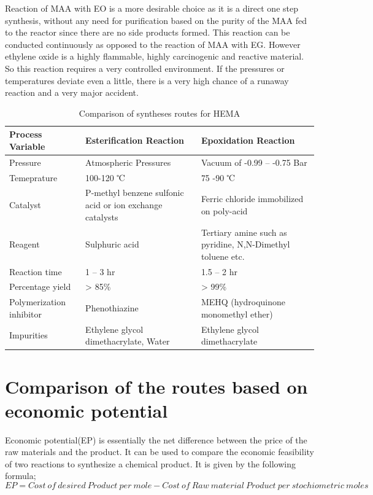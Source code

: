 \documentclass[12pt,a4paper]{report}
\begin{document}
Reaction of MAA with EO is a more desirable choice as it is a direct one step synthesis, without any need for purification based on the purity of the MAA fed to the reactor since there are no side products formed. This reaction can be conducted continuously as opposed to the reaction of MAA with EG. However ethylene oxide is a highly flammable, highly carcinogenic and reactive material. So this reaction requires a very controlled environment. If the pressures or temperatures deviate even a little, there is a very high chance of a runaway reaction and a very major accident. 
\begin{table}[H]
	\centering
	\begin{tabular}{|p{3cm}|p{4cm}|p{4cm}|}
		\hline
		Process Variable & Esterification Reaction & Epoxidation Reaction \\
		\hline
		Pressure & Atmospheric Pressures & Vacuum of -0.99 – -0.75 Bar \\
		\hline
		Temeprature & 100-120 ℃ & 75 -90 ℃ \\
		\hline
		Catalyst & P-methyl benzene sulfonic acid or ion exchange catalysts & Ferric chloride immobilized on poly-acid \\
		\hline
		Reagent & Sulphuric acid & Tertiary amine such as pyridine, N,N-Dimethyl toluene etc. \\
		\hline
		Reaction time & 1 – 3 hr & 1.5 – 2 hr \\
		\hline
		Percentage yield & > 85\% & > 99\% \\
		\hline
		Polymerization inhibitor & Phenothiazine & MEHQ (hydroquinone monomethyl ether) \\
		\hline
		Impurities & Ethylene glycol dimethacrylate, Water & Ethylene glycol dimethacrylate \\
		\hline
	\end{tabular}
	\caption{Comparison of syntheses routes for HEMA}
	\label{tab::hysteresis}
\end{table}

\section{Comparison of the routes based on economic potential}
Economic potential(EP) is essentially the net difference between the price of the raw materials and the product. It can be used to compare the economic feasibility of two reactions to synthesize a chemical product.
It is given by the following formula;
$$ EP = Cost \ of \ desired \ Product \ per \ mole - Cost \ of \ Raw \ material \ Product \ per \ stochiometric \ moles $$
\end{document}
